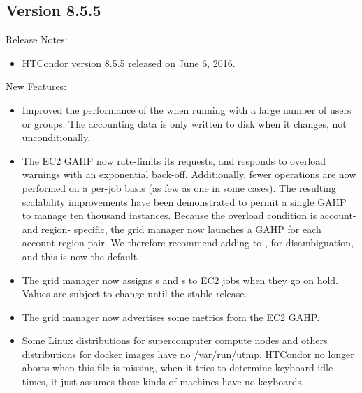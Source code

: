 \subsection*{\label{sec:New-8-5-5}Version 8.5.5}

\noindent Release Notes:

\begin{itemize}

\item HTCondor version 8.5.5 released on June 6, 2016.

\end{itemize}


\noindent New Features:

\begin{itemize}

\item Improved the performance of the  when running
with a large number of users or groups.  The accounting data is only
written to disk when it changes, not unconditionally.

\item The EC2 GAHP now rate-limits its requests, and responds to overload
warnings with an exponential back-off.  Additionally, fewer operations are
now performed on a per-job basis (as few as one in some cases).  The
resulting scalability improvements have been demonstrated to permit a single
GAHP to manage ten thousand instances.  Because the overload condition is
account- and region- specific, the grid manager now launches a GAHP for
each account-region pair.  We therefore recommend adding  to
, for disambiguation, and this is now the default.

\item The grid manager now assigns s and
s to EC2 jobs when they go on hold.  Values are
subject to change until the stable release.

\item The grid manager now advertises some metrics from the EC2 GAHP.

\item Some Linux distributions for supercomputer compute nodes and
others distributions for docker images have no /var/run/utmp. HTCondor no longer
aborts when this file is missing, when it tries to determine keyboard
idle times, it just assumes these kinds of machines have no keyboards.


\end{itemize}

